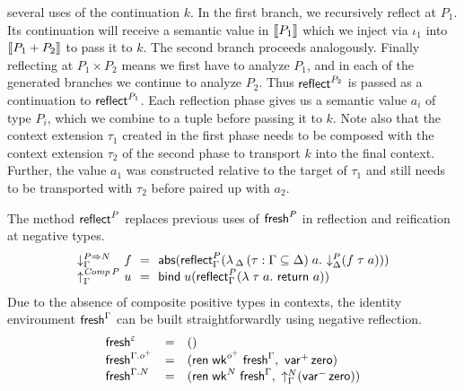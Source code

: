 \documentclass[sigplan,screen,fleqn,review]{acmart} %
\begin{document}
several uses of the continuation $k$.
In the first branch, we recursively reflect at $P_1$.  Its
continuation will receive a semantic value in $\mathopen{{[\kern-0.14em[}} P_1 \mathclose{{]\kern-0.14em]}}$ which we
inject via $\iota_1$ into $\mathopen{{[\kern-0.14em[}} P_1 + P_2 \mathclose{{]\kern-0.14em]}}$ to pass it to $k$.  The
second branch proceeds analogously.
Finally reflecting at $P_1 \times P_2$ means we first have to analyze
$P_1$, and in each of the generated branches we continue to analyze
$P_2$.  Thus $\mathsf{reflect}_{}^{P_2}$ is passed as a continuation to
$\mathsf{reflect}_{}^{P_1}$.  Each reflection phase gives us a semantic value
$a_i$ of type $P_i$, which we combine to a tuple before passing it to
$k$.  Note also that the context extension $\tau_1$ created in the
first phase needs to be composed with the context extension $\tau_2$
of the second phase to transport $k$ into the final context.  Further,
the value $a_1$ was constructed relative to the target of
$\tau_1$ and still needs
to be transported with $\tau_2$ before paired up with $a_2$.

The method $\mathsf{reflect}_{}^{P}$ replaces previous uses of $\mathsf{fresh}^P$ in
reflection and reification at negative types.
\[
\begin{array}{l@{~}l@{~~}c@{~~}l}
  \downG {P \To N} & f & = & \tabs
    \left(
      \reflect[\Gamma] P
        \left(
          \lambda \, _\Delta \, (\tau : \Gamma \sublist \Delta) \; a .\
          \down[\Delta] P (f \; \tau \; a)
        \right)
    \right)
  \\
  \upG {\Comp P} & u & = & \tbind \; u
    \left(
      \reflect[\Gamma] P
        \left(
          \lambda \; \tau \; a .\
          \treturn\; a
        \right)
    \right)
\end{array}
\]
Due to the absence of composite positive types in contexts,
the identity environment $\mathsf{fresh}^{\Gamma}$ can be built
straightforwardly using negative reflection.
\[
\begin{array}{lcl}
  \mathsf{fresh}^{\varepsilon} & = & () \\
  \mathsf{fresh}^{\Gamma.o^+} & = &
    (
      \mathsf{ren}\;\mathsf{wk}^{o^+}\;\mathsf{fresh}^{\Gamma}
      , \
      \mathsf{var}^{+}\,\mathsf{zero}
    ) \\
  \mathsf{fresh}^{\Gamma.N} & = &
    (
      \mathsf{ren}\;\mathsf{wk}^N\;\mathsf{fresh}^{\Gamma}
      , \
      \mathord{\uparrow_{\Gamma}^{N}} (\mathsf{var}^{-}\,\mathsf{zero})
    ) \\
\end{array}
\]
\end{document}
